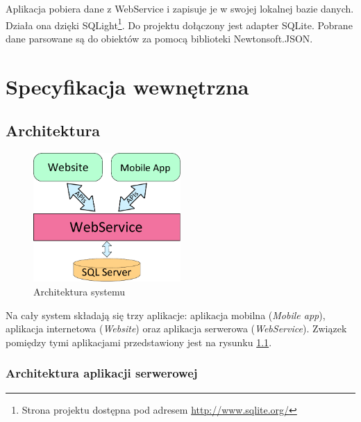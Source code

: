 \documentclass{book}
\begin{document}
		Aplikacja pobiera dane z WebService i zapisuje je w swojej lokalnej bazie danych. Działa ona dzięki SQLight\footnote{Strona projektu dostępna pod adresem \url{http://www.sqlite.org/}}. Do projektu dołączony jest adapter SQLite. Pobrane dane parsowane są do obiektów za pomocą biblioteki Newtonsoft.JSON.

	\chapter{Specyfikacja wewnętrzna}
		\section{Architektura}
		
		\begin{figure}		
			\centering
			\includegraphics[width=0.5\textwidth]{images/architektura.pdf}
			\caption{Architektura systemu}
			\label{fig:architektura}
		\end{figure}
		
		Na cały system składają się trzy aplikacje: aplikacja mobilna (\emph{Mobile app}), aplikacja internetowa (\emph{Website}) oraz aplikacja serwerowa (\emph{WebService}). Związek pomiędzy tymi aplikacjami przedstawiony jest na rysunku \ref{fig:architektura}. 
			
			\subsection{Architektura aplikacji serwerowej}
			
\end{document}
